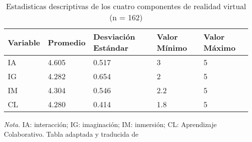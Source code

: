 \begin{table}[H]
   \caption{Estadisticas descriptivas de los cuatro componentes de realidad virtual (n = 162)}
   \label{tab:statsmoralvr}
   \begin{center}
      \begin{tabular}{p{2cm} p{2cm} p{2cm} p{2cm} p{2cm}}
         \hline
         Variable & Promedio & Desviación Estándar & Valor Mínimo & Valor Máximo\\
         \hline
         IA & 4.605 & 0.517 & 3 & 5\\
         IG & 4.282 & 0.654 & 2 & 5\\
         IM & 4.304 & 0.546 & 2.2 & 5\\
         CL & 4.280 & 0.414 & 1.8 & 5\\
         \hline
      \end{tabular}
   \end{center}
      \textit{Nota. }IA: interacción; IG: imaginación; IM: inmersión; CL: Aprendizaje Colaborativo. Tabla adaptada y traducida de \cite{SHIM2023100010}
\end{table}
